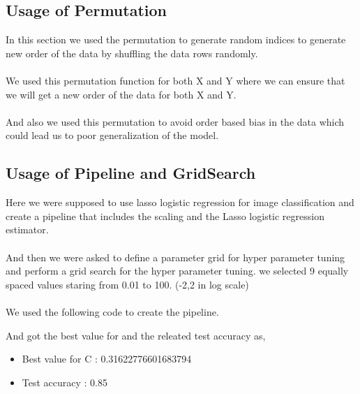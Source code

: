 \documentclass[11pt,a4paper]{article}
\begin{document}
\subsection{Usage of Permutation}

In this section we used the permutation to generate random indices to generate new order of the data by shuffling the data rows randomly.\\\\
We used this permutation function for both X and Y where we can ensure that we will get a new order of the data for both X and Y.\\\\
And also we used this permutation to avoid order based bias in the data which could lead us to poor generalization of the model.

\subsection{Usage of Pipeline and GridSearch}

Here we were supposed to use lasso logistic regression for image classification and create a pipeline that includes the
scaling and the Lasso logistic regression estimator.\\\\

And then we were asked to define a parameter grid for hyper parameter tuning and perform a grid search for the hyper parameter tuning. we selected 9 equally spaced values staring from 0.01 to 100. (-2,2 in log scale)\\\\ 

We used the following code to create the pipeline.

\lstset{style=mystyle}


And got the best value for and the releated test accuracy as,

\begin{itemize}
    \item Best value for C : 0.31622776601683794
    \item Test accuracy : 0.85
\end{itemize}
\end{document}
